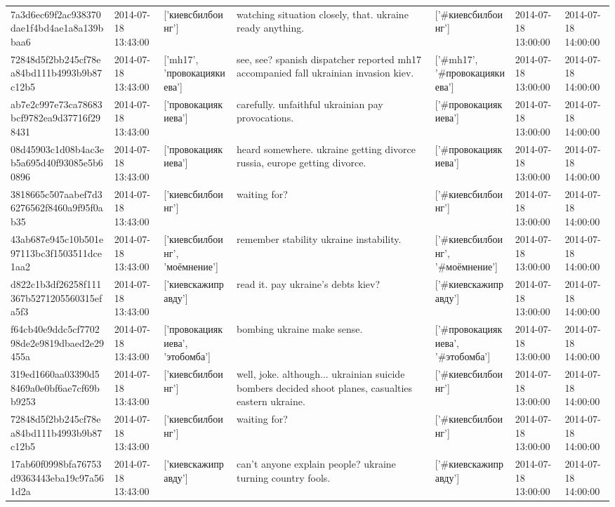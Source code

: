 \begin{tabular}{lllllll}
7a3d6ec69f2ac938370dae1f4bd4ae1a8a139bbaa6 & 2014-07-18 13:43:00 & ['киевсбилбоинг'] & watching situation closely, that. ukraine ready anything. & ['#киевсбилбоинг'] & 2014-07-18 13:00:00 & 2014-07-18 14:00:00 \\
72848d5f2bb245cf78ea84bd111b4993b9b87c12b5 & 2014-07-18 13:43:00 & ['mh17', 'провокациякиева'] & see, see? spanish dispatcher reported mh17 accompanied fall ukrainian invasion kiev. & ['#mh17', '#провокациякиева'] & 2014-07-18 13:00:00 & 2014-07-18 14:00:00 \\
ab7e2c997e73ca78683bcf9782ea9d37716f298431 & 2014-07-18 13:43:00 & ['провокациякиева'] & carefully. unfaithful ukrainian pay provocations. & ['#провокациякиева'] & 2014-07-18 13:00:00 & 2014-07-18 14:00:00 \\
08d45903c1d08b4ac3eb5a695d40f93085e5b60896 & 2014-07-18 13:43:00 & ['провокациякиева'] & heard somewhere. ukraine getting divorce russia, europe getting divorce. & ['#провокациякиева'] & 2014-07-18 13:00:00 & 2014-07-18 14:00:00 \\
3818665c507aabef7d36276562f8460a9f95f0ab35 & 2014-07-18 13:43:00 & ['киевсбилбоинг'] & waiting for? & ['#киевсбилбоинг'] & 2014-07-18 13:00:00 & 2014-07-18 14:00:00 \\
43ab687e945c10b501e97113bc3f1503511dce1aa2 & 2014-07-18 13:43:00 & ['киевсбилбоинг', 'моёмнение'] & remember stability ukraine instability. & ['#киевсбилбоинг', '#моёмнение'] & 2014-07-18 13:00:00 & 2014-07-18 14:00:00 \\
d822c1b3df26258f111367b5271205560315efa5f3 & 2014-07-18 13:43:00 & ['киевскажиправду'] & read it. pay ukraine's debts kiev? & ['#киевскажиправду'] & 2014-07-18 13:00:00 & 2014-07-18 14:00:00 \\
f64cb40e9ddc5cf770298de2e9819dbaed2e29455a & 2014-07-18 13:43:00 & ['провокациякиева', 'этобомба'] & bombing ukraine make sense. & ['#провокациякиева', '#этобомба'] & 2014-07-18 13:00:00 & 2014-07-18 14:00:00 \\
319ed1660aa03390d58469a0e0bf6ae7cf69bb9253 & 2014-07-18 13:43:00 & ['киевсбилбоинг'] & well, joke. although... ukrainian suicide bombers decided shoot planes, casualties eastern ukraine. & ['#киевсбилбоинг'] & 2014-07-18 13:00:00 & 2014-07-18 14:00:00 \\
72848d5f2bb245cf78ea84bd111b4993b9b87c12b5 & 2014-07-18 13:43:00 & ['киевсбилбоинг'] & waiting for? & ['#киевсбилбоинг'] & 2014-07-18 13:00:00 & 2014-07-18 14:00:00 \\
17ab60f0998bfa76753d9363443eba19c97a561d2a & 2014-07-18 13:43:00 & ['киевскажиправду'] & can't anyone explain people? ukraine turning country fools. & ['#киевскажиправду'] & 2014-07-18 13:00:00 & 2014-07-18 14:00:00 \\

\end{tabular}
